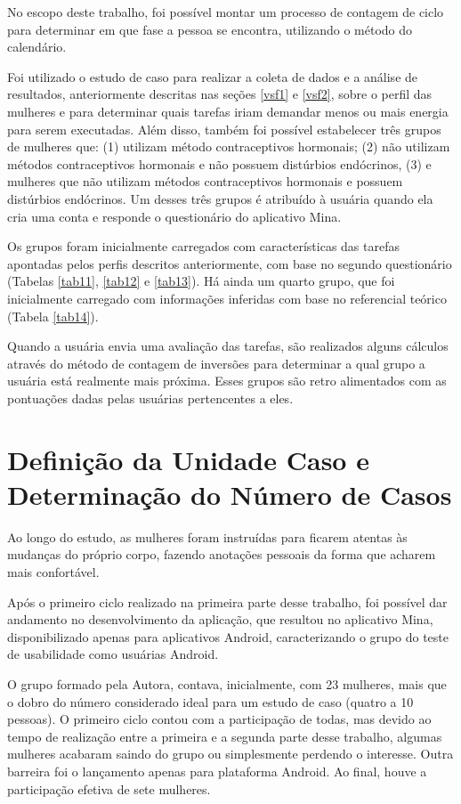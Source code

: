 No escopo deste trabalho, foi possível montar um processo de contagem de ciclo para determinar em que fase a pessoa se encontra, utilizando o 
método do calendário.

Foi utilizado o estudo de caso para realizar a coleta de dados e a análise de resultados, anteriormente descritas nas seções \ref{vsf1} e \ref{vsf2}, 
sobre o perfil das mulheres e para determinar quais tarefas iriam demandar 
menos ou mais energia para serem executadas. Além disso, também foi possível estabelecer três grupos de mulheres que: (1) utilizam método contraceptivos hormonais; (2) não utilizam métodos contraceptivos hormonais e 
não possuem distúrbios endócrinos, (3) e mulheres que não utilizam métodos contraceptivos hormonais e possuem distúrbios endócrinos. 
Um desses três grupos é atribuído à usuária quando ela cria uma conta e responde o questionário do aplicativo Mina. 

Os grupos foram inicialmente carregados com características das tarefas apontadas pelos perfis descritos anteriormente, 
com base no segundo questionário (Tabelas \ref{tab11}, \ref{tab12} e \ref{tab13}). Há ainda um quarto grupo, que foi inicialmente carregado com informações inferidas com 
base no referencial teórico (Tabela \ref{tab14}).

Quando a usuária envia uma avaliação das tarefas, são realizados alguns cálculos através do método de contagem de inversões para determinar 
a qual grupo a usuária está realmente mais próxima. Esses grupos são retro alimentados com as pontuações dadas pelas usuárias pertencentes a eles.

\section{Definição da Unidade Caso e Determinação do Número de Casos}

Ao longo do estudo, as mulheres foram instruídas para ficarem atentas às mudanças do próprio corpo, fazendo anotações pessoais 
da forma que acharem mais confortável.

Após o primeiro ciclo realizado na primeira parte desse trabalho, foi possível dar andamento no desenvolvimento da aplicação, 
que resultou no aplicativo Mina, disponibilizado apenas para aplicativos Android, caracterizando o grupo do teste de usabilidade como 
usuárias Android.

O grupo formado pela Autora, contava, inicialmente, com 23 mulheres, mais que o dobro do número considerado ideal 
para um estudo de caso (quatro a 10 pessoas). 
O primeiro ciclo contou com a participação de todas, mas devido ao tempo de realização entre a primeira e a segunda parte desse trabalho, 
algumas mulheres acabaram saindo do grupo ou simplesmente perdendo o interesse. Outra barreira foi o lançamento apenas para plataforma Android. 
Ao final, houve a participação efetiva de sete mulheres.


